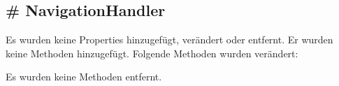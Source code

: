 \documentclass[../implementierung.tex]{subfiles}
\begin{document}
		\subsection{\# NavigationHandler}
			Es wurden keine Properties hinzugefügt, verändert oder entfernt. \newline
			Er wurden keine Methoden hinzugefügt. \newline
			Folgende Methoden wurden verändert:
			\begin{itemize}
			\end{itemize}
			Es wurden keine Methoden entfernt.
\end{document}
